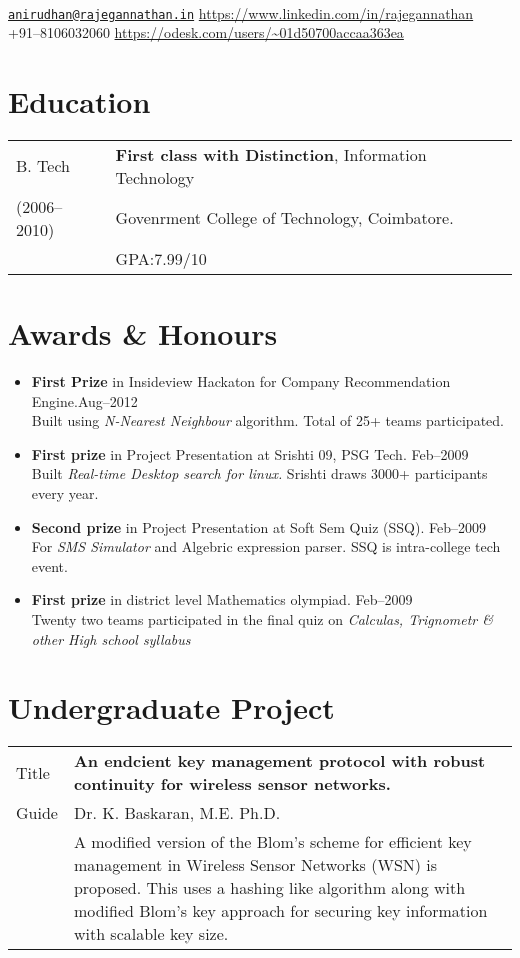 \documentclass{resume}
\begin{document}
\\
{\href{mailto:anirudhan@rajegannathan.in}{\nolinkurl{anirudhan@rajegannathan.in}} \hfill \url{https://www.linkedin.com/in/rajegannathan}}\\
{+91--8106032060 \hfill \url{https://odesk.com/users/~01d50700accaa363ea}}

\section{Education}
\begin{tabular}{>{\centering\arraybackslash}p{1in}l}
  B. Tech & \textbf{First class with Distinction}, Information Technology\\
  \small{(2006--2010)} & Govenrment College of Technology, Coimbatore.\\
    & GPA:\@ 7.99/10
\end{tabular}

\section{Awards \& Honours}
  \begin{itemize}[label={$\ast$}]
    \item \textbf{First Prize} in Insideview Hackaton for Company Recommendation Engine.\hfill Aug--2012\\
      \small{Built using \textit{N-Nearest Neighbour} algorithm.  Total of 25+ teams participated.}
    \item \textbf{First prize} in Project Presentation at Srishti 09, PSG Tech. \hfill Feb--2009\\
      \small{Built \textit{Real-time Desktop search for linux.} Srishti draws 3000+ participants every year.}
    \item \textbf{Second prize} in Project Presentation at Soft Sem Quiz (SSQ). \hfill Feb--2009\\
      \small{For \textit{SMS Simulator} and Algebric expression parser. SSQ is intra-college tech event.}
    \item \textbf{First prize} in district level Mathematics olympiad. \hfill Feb--2009\\
      \small{Twenty two teams participated in the final quiz on \textit{Calculas, Trignometr \& other High school syllabus}}
  \end{itemize}

\section{Undergraduate Project}
\begin{tabular}{l p{5.6in}}
  Title & \textbf{An endcient key management protocol with robust continuity for wireless sensor networks.}\\
  Guide & Dr. K. Baskaran, M.E. Ph.D.\\
        & A modified version of the Blom's scheme for efficient key management in Wireless Sensor Networks (WSN) is proposed.  This uses a hashing like algorithm along with modified Blom's key approach for securing key information with scalable key size.
\end{tabular}
\end{document}
